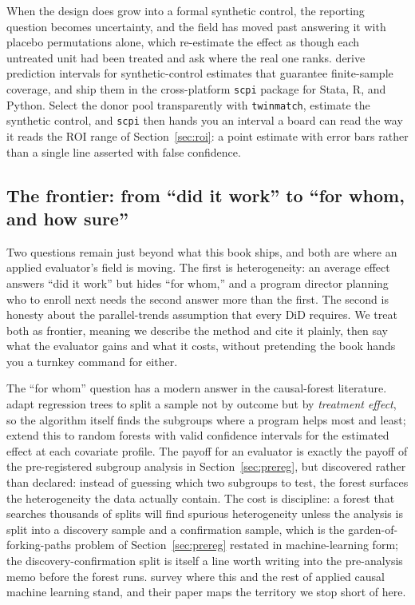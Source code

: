 \documentclass[
    a4paper,
    fontsize=10pt,
    twoside=true,
    numbers=noenddot,
]{kaobook}
\begin{document}
When the design does grow into a formal synthetic control, the reporting question becomes uncertainty, and the field has moved past answering it with placebo permutations alone, which re-estimate the effect as though each untreated unit had been treated and ask where the real one ranks. \textcite{cattaneo2021prediction} derive prediction intervals for synthetic-control estimates that guarantee finite-sample coverage, and \textcite{cattaneo2025scpi} ship them in the cross-platform \texttt{scpi} package for Stata, R, and Python. Select the donor pool transparently with \texttt{twinmatch}, estimate the synthetic control, and \texttt{scpi} then hands you an interval a board can read the way it reads the ROI range of Section~\ref{sec:roi}: a point estimate with error bars rather than a single line asserted with false confidence.

\subsection{The frontier: from ``did it work'' to ``for whom, and how sure''}\label{ch08-sec:frontier}
Two questions remain just beyond what this book ships, and both are where an applied evaluator's field is moving. The first is heterogeneity: an average effect answers \enquote{did it work} but hides \enquote{for whom,} and a program director planning who to enroll next needs the second answer more than the first. The second is honesty about the parallel-trends assumption that every DiD requires. We treat both as frontier, meaning we describe the method and cite it plainly, then say what the evaluator gains and what it costs, without pretending the book hands you a turnkey command for either.

The \enquote{for whom} question has a modern answer in the causal-forest literature. \textcite{athey2016recursive} adapt regression trees to split a sample not by outcome but by \emph{treatment effect}, so the algorithm itself finds the subgroups where a program helps most and least; \textcite{wager2018forests} extend this to random forests with valid confidence intervals for the estimated effect at each covariate profile. The payoff for an evaluator is exactly the payoff of the pre-registered subgroup analysis in Section~\ref{sec:prereg}, but discovered rather than declared: instead of guessing which two subgroups to test, the forest surfaces the heterogeneity the data actually contain. The cost is discipline: a forest that searches thousands of splits will find spurious heterogeneity unless the analysis is split into a discovery sample and a confirmation sample, which is the garden-of-forking-paths problem of Section~\ref{sec:prereg} restated in machine-learning form; the discovery-confirmation split is itself a line worth writing into the pre-analysis memo before the forest runs. \textcite{athey2017state} survey where this and the rest of applied causal machine learning stand, and their paper maps the territory we stop short of here.
\end{document}
